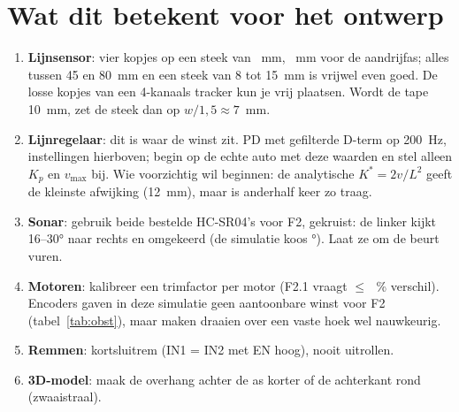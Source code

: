 \documentclass[10pt,a4paper]{article}
\providecommand{\ObstAlfaKruisLo}{16}
\providecommand{\ObstAlfaKruisHi}{30}
\begin{document}
\section{Wat dit betekent voor het ontwerp}
\begin{enumerate}[leftmargin=6mm]
\item \textbf{Lijnsensor}: vier kopjes op een steek van \LijnBestSteek~mm, \LijnBestL~mm voor de
  aandrijfas; alles tussen 45 en 80~mm en een steek van 8 tot 15~mm is vrijwel even goed. De losse
  kopjes van een 4-kanaals tracker kun je vrij plaatsen. Wordt de tape 10~mm, zet de steek dan op
  $w/1{,}5 \approx 7$~mm.
\item \textbf{Lijnregelaar}: dit is waar de winst zit. PD met gefilterde D-term op 200~Hz, instellingen
  hierboven; begin op de echte auto met deze waarden en stel alleen $K_p$ en $v_{\max}$ bij. Wie
  voorzichtig wil beginnen: de analytische $K^* = 2v/L^2$ geeft de kleinste afwijking (12~mm), maar is
  anderhalf keer zo traag.
\item \textbf{Sonar}: gebruik beide bestelde HC-SR04's voor F2, gekruist: de linker kijkt
  \ObstAlfaKruisLo--\ObstAlfaKruisHi° naar rechts en omgekeerd (de simulatie koos \ObstBestAlfa°).
  Laat ze om de beurt vuren.
\item \textbf{Motoren}: kalibreer een trimfactor per motor (F2.1 vraagt $\le$\,\ObstDeltaMax~\%
  verschil). Encoders gaven in deze simulatie geen aantoonbare winst voor F2 (tabel~\ref{tab:obst}),
  maar maken draaien over een vaste hoek wel nauwkeurig.
\item \textbf{Remmen}: kortsluitrem (IN1 = IN2 met EN hoog), nooit uitrollen.
\item \textbf{3D-model}: maak de overhang achter de as korter of de achterkant rond (zwaaistraal).
\end{enumerate}
\end{document}

